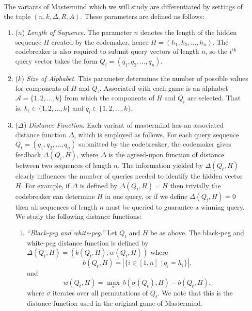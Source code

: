 \documentclass[12pt, a4paper]{article}
\newcommand{\nth}{^{\text{th}}}       %
\begin{document}
The variants of Mastermind which we will study are differentiated by settings of the tuple $(n, k, \Delta, R, A)$. These parameters are defined as follows:
\begin{enumerate}[label=(\roman*)]
	\item ($n$) \textit{Length of Sequence.} The parameter $n$ denotes the length of the hidden sequence $H$ created by the codemaker, hence $H = (h_1, h_2, \ldots, h_n)$. The codebreaker is also required to submit query vectors of length $n$, so the $t\nth$ query vector takes the form $Q_t = (q_1, q_2, \ldots, q_n)$.
	
	\item ($k$) \textit{Size of Alphabet.} This parameter determines the number of possible values for components of $H$ and $Q_t$. Associated with each game is an alphabet $\mathcal{A} = \{1,2,\ldots,k\}$ from which the components of $H$ and $Q_t$ are selected. That is, $h_i\in\{1,2,\ldots,k\}$ and $q_i\in\{1,2,\ldots,k\}$.
	
	\item($\Delta$) \textit{Distance Function.} Each variant of mastermind has an associated distance function $\Delta$, which is employed as follows. For each query sequence $Q_t = (q_1, q_2, \ldots, q_n)$ submitted by the codebreaker, the codemaker gives feedback $\Delta(Q_t, H)$, where $\Delta$ is the agreed-upon function of distance between two sequences of length $n$. The information yielded by $\Delta(Q_t, H)$ clearly influences the number of queries needed to identify the hidden vector $H$. For example, if $\Delta$ is defined by $\Delta(Q_t, H) = H$ then trivially the codebreaker can determine $H$ in one query, or if we define $\Delta(Q_t, H) = 0$ then all sequences of length $n$ must be queried to guarantee a winning query. We study the following distance functions:
	\begin{enumerate}[label=\alph*.]
		\item\textit{``Black-peg and white-peg.''} Let $Q_t$ and $H$ be as above. The black-peg and white-peg distance function is defined by $\Delta(Q_t, H) = (b(Q_t, H), w(Q_t, H))$ where
		\begin{equation}\label{blackHitsDefinition}
			b(Q_t, H) = \left|\{i\in [1,n] \mid q_i = h_i\}\right|,
		\end{equation}
		and
		\begin{equation*}\label{whiteHitsDefinition}
			w(Q_t, H) = \max_{\sigma}~b(\sigma(Q_t), H) - b(Q_t, H),
		\end{equation*}
		where $\sigma$ iterates over all permutations of $Q_t$. We note that this is the distance function used in the original game of Mastermind.


\end{enumerate}
\end{enumerate}
\end{document}
